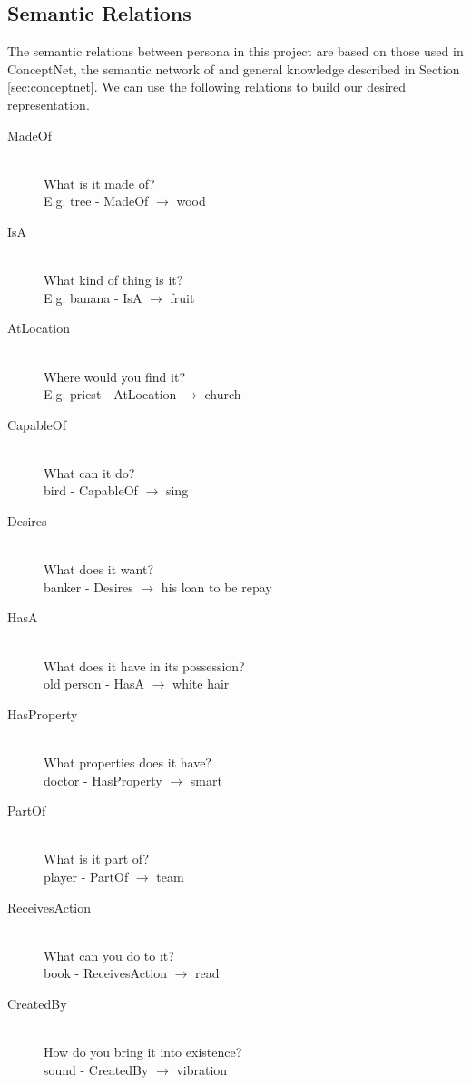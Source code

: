 \subsection{Semantic Relations}
The semantic relations between persona in this project are based on those used in ConceptNet, the semantic network of and general knowledge described in Section \ref{sec:conceptnet}. We can use the following relations to build our desired representation.

\begin{description}
\item[MadeOf] \hfill \\ What is it made of? \hfill \\ E.g. tree - MadeOf $\rightarrow$ wood
\item[IsA] \hfill \\ What kind of thing is it? \hfill \\ E.g. banana - IsA $\rightarrow$ fruit
\item[AtLocation] \hfill \\ Where would you find it? \hfill \\ E.g. priest - AtLocation $\rightarrow$ church
\item[CapableOf] \hfill \\ What can it do? \hfill \\ bird - CapableOf $\rightarrow$ sing
\item[Desires] \hfill \\ What does it want? \hfill \\ banker - Desires $\rightarrow$ his loan to be repay
\item[HasA] \hfill \\ What does it have in its possession? \hfill \\ old person - HasA $\rightarrow$ white hair
\item[HasProperty] \hfill \\ What properties does it have? \hfill \\ doctor - HasProperty $\rightarrow$ smart
\item[PartOf] \hfill \\ What is it part of? \hfill \\ player - PartOf $\rightarrow$ team
\item[ReceivesAction] \hfill \\What can you do to it? \hfill \\ book - ReceivesAction $\rightarrow$ read
\item[CreatedBy] \hfill \\ How do you bring it into existence? \hfill \\ sound - CreatedBy $\rightarrow$ vibration

\end{description}
